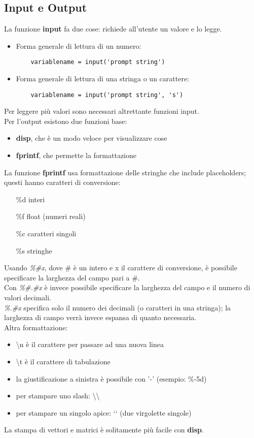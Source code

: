 \documentclass[a4paper, 10pt]{article}
\begin{document}
\subsection{Input e Output}
La funzione \textbf{input} fa due cose: richiede all'utente un valore e lo legge.
\begin{itemize}
\item Forma generale di lettura di un numero:
	\begin{lstlisting}
	variablename = input('prompt string')
	\end{lstlisting}
\item Forma generale di lettura di una stringa o un carattere:
	\begin{lstlisting}
	variablename = input('prompt string', 's')
	\end{lstlisting}
\end{itemize}
Per leggere più valori sono necessari altrettante funzioni input. \bigskip \\
Per l'output esistono due funzioni base:
\begin{itemize}
\item \textbf{disp}, che è un modo veloce per visualizzare cose
\item \textbf{fprintf}, che permette la formattazione
\end{itemize}
La funzione \textbf{fprintf} usa formattazione delle stringhe che include placeholders; questi hanno caratteri di conversione:

\begin{itemize}
\item[\%d] interi
\item[\%f] float (numeri reali)
\item[\%c] caratteri singoli
\item[\%s] stringhe
\end{itemize}
Usando \textit{\%\#x}, dove \# è un intero e x il carattere di conversione, è possibile specificare la larghezza del campo pari a \#.\\
Con \textit{\%\#.\#x} è invece possibile specificare la larghezza del campo e il numero di valori decimali.\\
\textit{\%.\#x} specifica solo il numero dei decimali (o caratteri in una stringa); la larghezza di campo verrà invece espansa di quanto necessaria.\medskip \\ 
Altra formattazione:
\begin{itemize}
\item \textbackslash{}n è il carattere per passare ad una nuova linea
\item \textbackslash{}t è il carattere di tabulazione
\item la giustificazione a sinistra è possibile con '-' (esempio: \%-5d)
\item per stampare uno slash: \textbackslash{}\textbackslash{}
\item per stampare un singolo apice: \lq{}\lq{} (due virgolette singole)
\end{itemize}
La stampa di vettori e matrici è solitamente più facile con \textbf{disp}.
\end{document}
